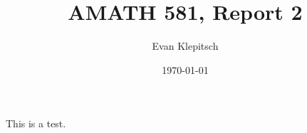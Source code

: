 \documentclass{article}
\title{AMATH 581, Report 2}
\author{Evan Klepitsch}
\date{\today}
\begin{document}
	\maketitle
	This is a test.
\end{document}
